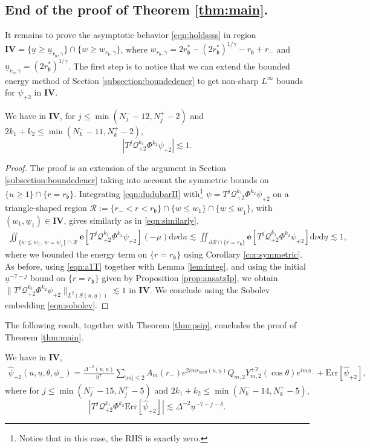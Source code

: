 \documentclass[reqno]{amsart}
\numberwithin{equation}{section}
\newcommand{\quatre}{\mathbf{IV}}
\newcommand{\mcq}{\mathcal{Q}}
\newcommand{\wbar}{\underline{w}}
\newcommand{\ubar}{{\underline{u}}}
\newcommand{\carterp}{\mcq_{+2}}
\newcommand{\dee}{\mathrm{d}}
\newcommand{\ener}{\mathbf{e}}
\newcommand{\psihat}{\widehat{\psi}}
\newcommand{\rb}{r_\mathfrak{b}}
\newcommand{\Psip}{\psi_{+2}}
\newcommand{\psip}{\psi_{+2}}
\newcommand{\psihatp}{\psihat_{+2}}
\newcommand{\sfrak}{2}
\theoremstyle{plain}
\theoremstyle{definition}
\theoremstyle{remark}
\numberwithin{equation}{section}
\begin{document}
\subsection{End of the proof of Theorem \ref{thm:main}.}
It remains to prove the asymptotic behavior \eqref{eqn:holdssss} in region $\quatre=\{\ubar\geq\ubar_{\rb,\gamma}\}\cap\{w\geq w_{\rb,\gamma}\}$, where $w_{\rb,\gamma}=2\rb^*-(2\rb^*)^{1/\gamma}-\rb+r_-$ and $\ubar_{\rb,\gamma}=(2\rb^*)^{1/\gamma}$. The first step is to notice that we can extend the bounded energy method of Section \ref{subsection:boundedener} to get non-sharp $L^\infty$ bounds for $\psip$ in $\quatre$.
\begin{lem}\label{lem:ansatzmIV}
    We have in $\quatre$, for $j\leq \min(N_j^--12,N_j^+-2)$ and $2k_1+k_2\leq \min(N_k^--11,N_k^+-2)$,
    $$|T^j\carterp^{k_1}\Phi^{k_2}\psip|\lesssim 1.$$
\end{lem}
\begin{proof}
    The proof is an extension of the argument in Section \ref{subsection:boundedener} taking into account the symmetric bounds on $\{u\geq 1\}\cap\{r=\rb\}$. Integrating \eqref{eqn:dudubarII} with\footnote{Notice that in this case, the RHS is exactly zero.} $\psi=T^j\carterp^{k_1}\Phi^{k_2}\psip$ on a triangle-shaped region $\mathcal{R}:=\{r_-<r<\rb\}\cap\{w\leq w_1\}\cap\{\wbar\leq\wbar_1\}$, with $(w_1,\wbar_1)\in\quatre$, gives similarly as in \eqref{eqn:similarly},
    \begin{align}\label{eqn:a1T}
        \iint_{\{w\leq w_1,\:\wbar=\wbar_1\}\cap\mathcal{R}}{\ener}[T^j\carterp^{k_1}\Phi^{k_2}\psip](-\mu)\dee\nu\dee u\lesssim \iint_{\partial\mathcal{R}\cap\{r=\rb\}}\ener[T^j\carterp^{k_1}\Phi^{k_2}\psip]\dee\nu\dee\ubar\lesssim 1,
    \end{align}
where we bounded the energy term on $\{r=\rb\}$ using Corollary \ref{cor:symmetric}. As before, using \eqref{eqn:a1T} together with Lemma \ref{lem:integ}, and using the initial $\ubar^{-7-j}$ bound on $\{r=\rb\}$ given by Proposition \ref{prop:ansatzIp}, we obtain $\|T^j\carterp^{k_1}\Phi^{k_2}\Psip\|_{L^2(S(u,\ubar))}\lesssim 1$ in $\quatre$. We conclude using the Sobolev embedding \eqref{eqn:sobolev}.
\end{proof}
The following result, together with Theorem \ref{thm:psip}, concludes the proof of Theorem \ref{thm:main}.
\begin{thm}\label{thm:psipIV}
    We have in $\quatre$,   
        \begin{align*}
    \psihatp(u,\ubar,\theta,\phi_{-})=\frac{\Delta^{-2}(u,\ubar)}{\ubar^7}\sum_{|m|\leq2}A_m(r_-)e^{2imr_{mod}(u,\ubar)}Q_{m,\sfrak}Y_{m,\sfrak}^{+\sfrak}(\cos\theta)e^{im\phi_{-}}
    +\mathrm{Err}[\psihatp],
\end{align*}
where for $j\leq \min(N_j^--15,N_j^+-5)$ and $2k_1+k_2\leq \min(N_k^--14,N_k^+-5)$, $$|T^j\carterp^{k_1}\Phi^{k_2}\mathrm{Err}[\psihatp]|\lesssim\Delta^{-2}\ubar^{-7-j-\delta}.
$$
\end{thm}
\end{document}
